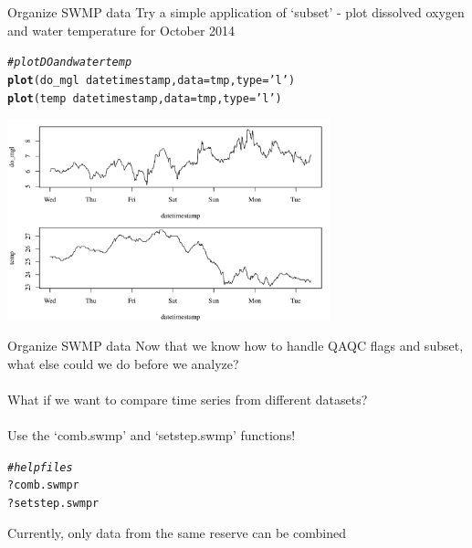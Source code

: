 \documentclass[xcolor=svgnames]{beamer}\usepackage[]{graphicx}\usepackage[]{color}
\makeatletter
\newcommand{\hlstr}[1]{\textcolor[rgb]{0.192,0.494,0.8}{#1}}%
\newcommand{\hlcom}[1]{\textcolor[rgb]{0.678,0.584,0.686}{\textit{#1}}}%
\newcommand{\hlopt}[1]{\textcolor[rgb]{0,0,0}{#1}}%
\newcommand{\hlstd}[1]{\textcolor[rgb]{0.345,0.345,0.345}{#1}}%
\newcommand{\hlkwc}[1]{\textcolor[rgb]{0.333,0.667,0.333}{#1}}%
\newcommand{\hlkwd}[1]{\textcolor[rgb]{0.737,0.353,0.396}{\textbf{#1}}}%
\newenvironment{kframe}{%
 \def\at@end@of@kframe{}%
 \ifinner\ifhmode%
  \def\at@end@of@kframe{\end{minipage}}%
  \begin{minipage}{\columnwidth}%
 \fi\fi%
 \def\FrameCommand##1{\hskip\@totalleftmargin \hskip-\fboxsep
 \colorbox{shadecolor}{##1}\hskip-\fboxsep
     \hskip-\linewidth \hskip-\@totalleftmargin \hskip\columnwidth}%
 \MakeFramed {\advance\hsize-\width
   \@totalleftmargin\z@ \linewidth\hsize
   \@setminipage}}%
 {\par\unskip\endMakeFramed%
 \at@end@of@kframe}
\newenvironment{knitrout}{}{} %
\makeatother
\begin{document}
\begin{frame}[containsverbatim]{Organize SWMP data}
Try a simple application of `subset' - plot dissolved oxygen and water temperature for October 2014
\begin{knitrout}\scriptsize
{}\color{fgcolor}\begin{kframe}
\begin{alltt}
\hlcom{# plot DO and water temp}
\hlkwd{plot}\hlstd{(do_mgl} \hlopt{~} \hlstd{datetimestamp,} \hlkwc{data} \hlstd{= tmp,} \hlkwc{type} \hlstd{=} \hlstr{'l'}\hlstd{)}
\hlkwd{plot}\hlstd{(temp} \hlopt{~} \hlstd{datetimestamp,} \hlkwc{data} \hlstd{= tmp,} \hlkwc{type} \hlstd{=} \hlstr{'l'}\hlstd{)}
\end{alltt}
\end{kframe}
\end{knitrout}
\begin{knitrout}\scriptsize
{}\color{fgcolor}

{\centering \includegraphics[width=0.7\textwidth]{figure/sub_plo} 

}



\end{knitrout}
\end{frame}

\begin{frame}[containsverbatim]{Organize SWMP data}
Now that we know how to handle QAQC flags and subset, what else could we do before we analyze? \\~\\
What if we want to compare time series from different datasets? \\~\\
Use the `comb.swmp' and `setstep.swmp' functions!
\begin{knitrout}\scriptsize
{}\color{fgcolor}\begin{kframe}
\begin{alltt}
\hlcom{# help files}
\hlopt{?}\hlstd{comb.swmpr}
\hlopt{?}\hlstd{setstep.swmpr}
\end{alltt}
\end{kframe}
\end{knitrout}
Currently, only data from the same reserve can be combined
\end{frame}
\end{document}
